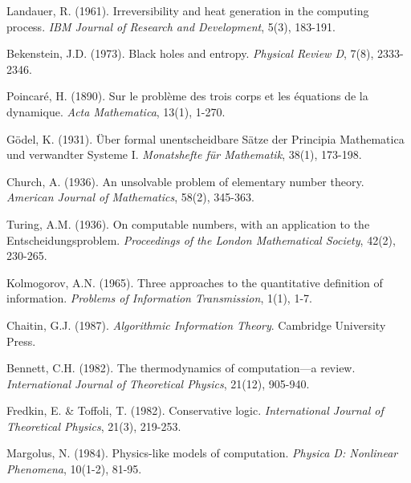 \documentclass[11pt,a4paper]{article}
\theoremstyle{remark}
\begin{document}
\begin{thebibliography}{99}
Landauer, R. (1961). Irreversibility and heat generation in the computing process. \textit{IBM Journal of Research and Development}, 5(3), 183-191.

Bekenstein, J.D. (1973). Black holes and entropy. \textit{Physical Review D}, 7(8), 2333-2346.

Poincaré, H. (1890). Sur le problème des trois corps et les équations de la dynamique. \textit{Acta Mathematica}, 13(1), 1-270.

Gödel, K. (1931). Über formal unentscheidbare Sätze der Principia Mathematica und verwandter Systeme I. \textit{Monatshefte für Mathematik}, 38(1), 173-198.

Church, A. (1936). An unsolvable problem of elementary number theory. \textit{American Journal of Mathematics}, 58(2), 345-363.

Turing, A.M. (1936). On computable numbers, with an application to the Entscheidungsproblem. \textit{Proceedings of the London Mathematical Society}, 42(2), 230-265.

Kolmogorov, A.N. (1965). Three approaches to the quantitative definition of information. \textit{Problems of Information Transmission}, 1(1), 1-7.

Chaitin, G.J. (1987). \textit{Algorithmic Information Theory}. Cambridge University Press.

Bennett, C.H. (1982). The thermodynamics of computation—a review. \textit{International Journal of Theoretical Physics}, 21(12), 905-940.

Fredkin, E. \& Toffoli, T. (1982). Conservative logic. \textit{International Journal of Theoretical Physics}, 21(3), 219-253.

Margolus, N. (1984). Physics-like models of computation. \textit{Physica D: Nonlinear Phenomena}, 10(1-2), 81-95.

\end{thebibliography}
\end{document}
